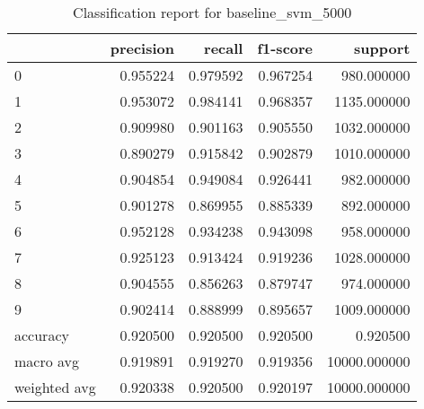 \begin{table}[htb!]
\centering
\begin{tabular}{lrrrr}
    \toprule
    & precision & recall & f1-score & support \\
    \midrule
    0 & 0.955224 & 0.979592 & 0.967254 & 980.000000 \\
    1 & 0.953072 & 0.984141 & 0.968357 & 1135.000000 \\
    2 & 0.909980 & 0.901163 & 0.905550 & 1032.000000 \\
    3 & 0.890279 & 0.915842 & 0.902879 & 1010.000000 \\
    4 & 0.904854 & 0.949084 & 0.926441 & 982.000000 \\
5 & 0.901278 & 0.869955 & 0.885339 & 892.000000 \\
6 & 0.952128 & 0.934238 & 0.943098 & 958.000000 \\
7 & 0.925123 & 0.913424 & 0.919236 & 1028.000000 \\
8 & 0.904555 & 0.856263 & 0.879747 & 974.000000 \\
9 & 0.902414 & 0.888999 & 0.895657 & 1009.000000 \\
accuracy & 0.920500 & 0.920500 & 0.920500 & 0.920500 \\
macro avg & 0.919891 & 0.919270 & 0.919356 & 10000.000000 \\
weighted avg & 0.920338 & 0.920500 & 0.920197 & 10000.000000 \\
\bottomrule
\end{tabular}
\caption{Classification report for baseline\_svm\_5000}
\label{tab:classification-report-baseline_svm_5000}
\end{table}

